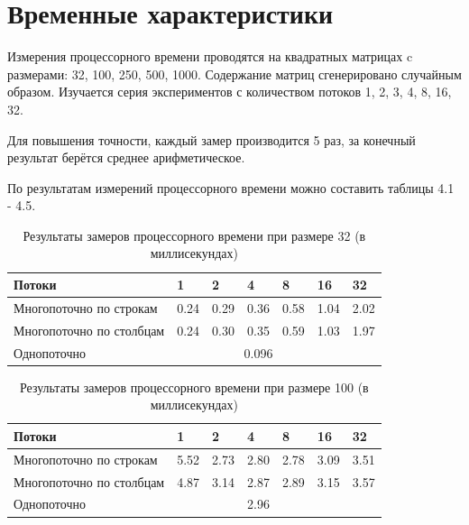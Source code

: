\documentclass[12pt,a4paper]{report}
\begin{document}
\section{Временные характеристики}

Измерения процессорного времени проводятся на квадратных матрицах c размерами: 
32, 100, 250, 500, 1000. Содержание матриц сгенерировано случайным образом.
Изучается серия экспериментов с количеством потоков 1, 2, 3, 4, 8, 16, 32.

Для повышения точности, каждый замер производится 5 раз, за конечный результат 
берётся среднее арифметическое.

По результатам измерений процессорного времени можно составить таблицы 4.1 - 4.5.

\begin{table}[h!]
	\caption{Результаты замеров процессорного времени при размере 32 (в миллисекундах)}
	\label{tabular:timesandtenses}
	\begin{center}
		\begin{tabular}{ | l | l | l | l | l | l | l | }
			\hline
			Потоки                   & 1    & 2    & 4    & 8    & 16   & 32   \\ \hline
			Многопоточно по строкам  & 0.24 & 0.29 & 0.36 & 0.58 & 1.04 & 2.02 \\ \hline
			Многопоточно по столбцам & 0.24 & 0.30 & 0.35 & 0.59 & 1.03 & 1.97 \\ \hline
			Однопоточно              &      \multicolumn{5}{c}{0.096}   &      \\ \hline
		\end{tabular}
	\end{center}
\end{table}

\begin{table}[h!]
	\caption{Результаты замеров процессорного времени при размере 100 (в миллисекундах)}
	\label{tabular:timesandtenses}
	\begin{center}
		\begin{tabular}{ | l | l | l | l | l | l | l | }
			\hline
			Потоки                   & 1    & 2    & 4    & 8    & 16   & 32   \\ \hline
			Многопоточно по строкам  & 5.52 & 2.73 & 2.80 & 2.78 & 3.09 & 3.51 \\ \hline
			Многопоточно по столбцам & 4.87 & 3.14 & 2.87 & 2.89 & 3.15 & 3.57 \\ \hline
			Однопоточно              &      \multicolumn{5}{c}{2.96}    &      \\ \hline
		\end{tabular}
	\end{center}
\end{table}
\end{document}
